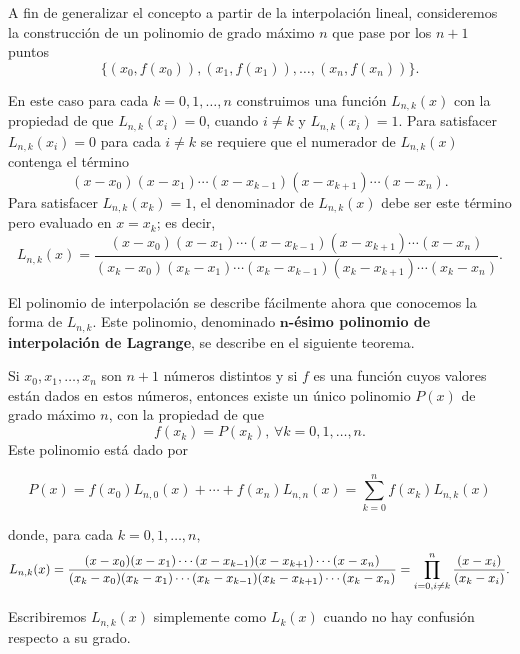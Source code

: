 A fin de generalizar el concepto a partir de la interpolación lineal, consideremos la construcción de un polinomio de grado máximo $n$ 
que pase por los $n+1$ puntos
$$\{(x_0, f(x_0)), (x_1, f(x_1)), \dots ,(x_n, f(x_n))\}.$$

En este caso para cada $k=0,1, \dots , n$ construimos una función $L_{n,k}(x)$ con la propiedad de que $L_{n,k}(x_i) = 0$, 
cuando $i\not= k$ y $L_{n,k}(x_i) = 1$.
Para satisfacer $L_{n,k}(x_i) = 0$ para cada $i\not= k$ se requiere que el numerador de $L_{n,k}(x)$ contenga el término
$$(x-x_0)(x-x_1)\cdots (x-x_{k-1})(x-x_{k+1})\cdots (x-x_n).$$
Para satisfacer $L_{n,k}(x_k) = 1$, el denominador de $L_{n,k}(x)$ debe ser este término pero evaluado en $x=x_k$; es decir,
$$L_{n,k}(x) = \dfrac{(x-x_0)(x-x_1)\cdots (x-x_{k-1})(x-x_{k+1})\cdots (x-x_n)}{(x_k-x_0)(x_k-x_1)\cdots (x_k-x_{k-1})(x_k-x_{k+1})\cdots (x_k-x_n)}.$$

El polinomio de interpolación se describe fácilmente ahora que conocemos la forma de $L_{n,k}$. Este polinomio, denominado 
\textbf{$\textbf{n}$-ésimo polinomio de interpolación de Lagrange}, se describe en el siguiente teorema.

\begin{theorem}
	Si $x_0, x_1, \dots , x_n$ son $n+1$ números distintos y si $f$ es una función cuyos valores están dados en estos números, entonces existe 
	un único polinomio $P(x)$ de grado máximo $n$, con la propiedad de que
	$$f(x_k) = P(x_k),\, \forall k=0,1,\dots , n.$$	
	Este polinomio está dado por
	
	\begin{equation}
		P(x) = f(x_0)L_{n,0}(x) + \cdots + f(x_n)L_{n,n}(x) = \sum_{k=0}^n f(x_k)L_{n,k}(x)
		\label{eq:polinomioLagrange}
	\end{equation}
	
	donde, para cada $k=0,1,\dots , n,$
	\begin{equation}
		L_{n,k}(x) = \dfrac{(x-x_0)(x-x_1)\cdots (x-x_{k-1})(x-x_{k+1})\cdots (x-x_n)}{(x_k-x_0)(x_k-x_1)\cdots (x_k-x_{k-1})(x_k-x_{k+1})\cdots (x_k-x_n)} \\
		= \prod_{i=0, i\not= k}^{n} \dfrac{(x-x_i)}{(x_k - x_i)}. 
		\label{eq:coeficientesLagrange}
	\end{equation}
\end{theorem}

Escribiremos $L_{n,k}(x)$ simplemente como $L_{k}(x)$ cuando no hay confusión respecto a su grado.

